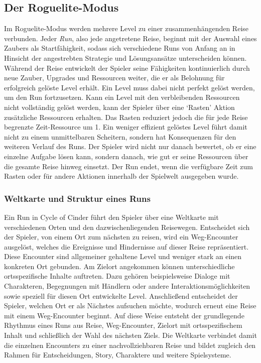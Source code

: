 \subsection{Der Roguelite-Modus}
Im Roguelite-Modus werden mehrere Level zu einer zusammenhängenden Reise verbunden.
Jeder \emph{Run}, also jede angetretene Reise, beginnt mit der Auswahl eines Zaubers als Startfähigkeit, sodass sich verschiedene Runs von Anfang an in Hinsicht der angestrebten Strategie und Lösungsansätze unterscheiden können.
Während der Reise entwickelt der Spieler seine Fähigkeiten kontinuierlich durch neue Zauber, Upgrades und Ressourcen weiter, die er als Belohnung für erfolgreich gelöste Level erhält.
Ein Level muss dabei nicht perfekt gelöst werden, um den Run fortzusetzen.
Kann ein Level mit den verbleibenden Ressourcen nicht vollständig gelöst werden, kann der Spieler über eine `Rasten' Aktion zusätzliche Ressourcen erhalten.
Das Rasten reduziert jedoch die für jede Reise begrenzte Zeit-Ressource um 1.
Ein weniger effizient gelöstes Level führt damit nicht zu einem unmittelbaren Scheitern, sondern hat Konsequenzen für den weiteren Verlauf des Runs.
Der Spieler wird nicht nur danach bewertet, ob er eine einzelne Aufgabe lösen kann, sondern danach, wie gut er seine Ressourcen über die gesamte Reise hinweg einsetzt.
Der Run endet, wenn die verfügbare Zeit zum Rasten oder für andere Aktionen innerhalb der Spielwelt ausgegeben wurde.

\subsubsection{Weltkarte und Struktur eines Runs}
Ein Run in Cycle of Cinder führt den Spieler über eine Weltkarte mit verschiedenen Orten und den dazwischenliegenden Reisewegen.
Entscheidet sich der Spieler, von einem Ort zum nächsten zu reisen, wird ein Weg-Encounter ausgelöst, welches die Ereignisse und Hindernisse auf dieser Reise repräsentiert.
Diese Encounter sind allgemeiner gehaltene Level und weniger stark an einen konkreten Ort gebunden.
Am Zielort angekommen können unterschiedliche ortsspezifische Inhalte auftreten.
Dazu gehören beispielsweise Dialoge mit Charakteren, Begegnungen mit Händlern oder andere Interaktionsmöglichkeiten sowie speziell für diesen Ort entwickelte Level.
Anschließend entscheidet der Spieler, welchen Ort er als Nächstes aufsuchen möchte, wodurch erneut eine Reise mit einem Weg-Encounter beginnt.
Auf diese Weise entsteht der grundlegende Rhythmus eines Runs aus Reise, Weg-Encounter, Zielort mit ortsspezifischem Inhalt und schließlich der Wahl des nächsten Ziels.
Die Weltkarte verbindet damit die einzelnen Encounters zu einer nachvollziehbaren Reise und bildet zugleich den Rahmen für Entscheidungen, Story, Charaktere und weitere Spielsysteme.

